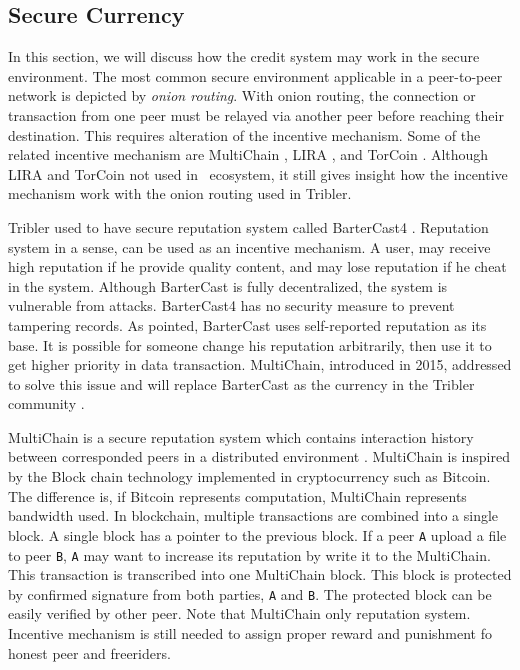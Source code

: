 \subsection{Secure Currency}
In this section, we will discuss how the credit system may work in the secure environment. The most common secure environment applicable in a peer-to-peer network is depicted by \textit{onion routing}. With onion routing, the connection or transaction from one peer must be relayed via another peer before reaching their destination. This requires alteration of the incentive mechanism. Some of the related incentive mechanism are MultiChain \cite{2015:multichain:norberhuis}, LIRA \cite{2013:lira:jansen}, and TorCoin \cite{2014:torcoin:ghosh}. Although LIRA and TorCoin not used in \bt~ecosystem, it still gives insight how the incentive mechanism work with the onion routing used in Tribler.

Tribler used to have secure reputation system called BarterCast4 \cite{2009:bartercast:meulpolder}. Reputation system in a sense, can be used as an incentive mechanism. A user, may receive high reputation if he provide quality content, and may lose reputation if he cheat in the system. Although BarterCast is fully decentralized, the system is vulnerable from attacks. BarterCast4 has no security measure to prevent tampering records. As \citeauthor{2015:multichain:norberhuis} pointed, BarterCast uses self-reported reputation as its base. It is possible for someone change his reputation arbitrarily, then use it to get higher priority in data transaction. MultiChain, introduced in 2015, addressed to solve this issue and will replace BarterCast as the currency in the Tribler community \cite{2015:multichain:norberhuis}. 

MultiChain is a secure reputation system which contains interaction history between corresponded peers in a distributed environment \cite{2015:multichain:norberhuis}. MultiChain is inspired by the Block chain technology implemented in cryptocurrency such as Bitcoin. The difference is, if Bitcoin represents computation, MultiChain represents bandwidth used. In blockchain, multiple transactions are combined into a single block. A single block has a pointer to the previous block. If a peer \texttt{A} upload a file to peer \texttt{B}, \texttt{A} may want to increase its reputation by write it to the MultiChain. This transaction is transcribed into one MultiChain block. This block is protected by confirmed signature from both parties, \texttt{A} and \texttt{B}. The protected block can be easily verified by other peer. Note that MultiChain only reputation system. Incentive mechanism is still needed to assign proper reward and punishment fo honest peer and freeriders.

